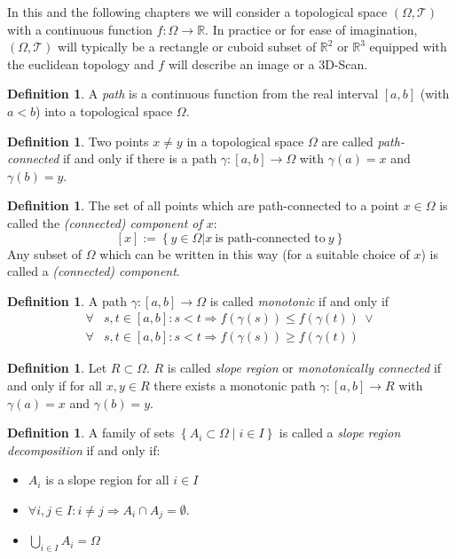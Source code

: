 \documentclass[a4paper,12pt,notitlepage,fullpage]{paper}
\theoremstyle{plain}
\theoremstyle{definition}
\newtheorem{defn}[thm]{Definition} %
\begin{document}

In this and the following chapters we will consider a topological space $(\Omega, \mathcal T)$ with a continuous function $f: \Omega \to \mathbb{R}$. In practice or for ease of imagination, $(\Omega, \mathcal T)$ will typically be a rectangle or cuboid subset of $\mathbb R^2$ or $\mathbb R^3$ equipped with the euclidean topology and $f$ will describe an image or a 3D-Scan.

\begin{defn}
A \emph{path} is a continuous function from the real interval $[a,b]$ (with $a<b$) into a topological space $\Omega$.
\end{defn}


\begin{defn}
Two points $x\neq y$ in a topological space $\Omega$ are called \emph{path-connected} if and only if there is a path $\gamma: [a,b] \to \Omega$ with $\gamma (a)=x$ and  $\gamma (b)=y$.
\end{defn}

\begin{defn}
The set of all points which are path-connected to a point $x\in\Omega$ is called the \emph{(connected) component of $x$}:
$$[x]:=\left\{ y\in\Omega | x ~\text{is path-connected to}~ y \right\}$$
Any subset of $\Omega$ which can be written in this way (for a suitable choice of $x$) is called a \emph{(connected) component}.
\end{defn}

\begin{defn}
A path $\gamma: [a,b] \to \Omega$ is called \emph{monotonic} if and only if
\begin{align*}
\forall & s, t \in [a,b]: s < t \Rightarrow f(\gamma(s)) \leq f(\gamma(t)) ~ \lor \\
\forall & s, t \in [a,b]: s < t \Rightarrow f(\gamma(s)) \geq f(\gamma(t))
\end{align*}
\end{defn}

\begin{defn}
Let $R \subset \Omega$. $R$ is called \emph{slope region} or \emph{monotonically connected} if and only if for all $x, y \in R$ there exists a monotonic path $\gamma: [a,b] \to R$ with $\gamma(a) = x$ and $\gamma(b) = y$.
\end{defn}

\begin{defn}
A family of sets $\left\{ A_i \subset \Omega \mid i \in I \right\}$ is called a \emph{slope region decomposition} if and only if:
\begin{itemize}
\item $A_i$ is a slope region for all $i \in I$
\item $\forall i,j \in I: i \neq j \Rightarrow A_i \cap A_j = \emptyset$.
\item $\bigcup_{i\in I} A_i = \Omega$
\end{itemize}
\end{defn}
\end{document}
